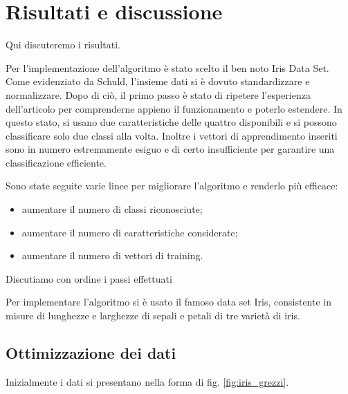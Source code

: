 \chapter{Risultati e discussione}\label{ch:risultati}

Qui discuteremo i risultati. 

Per l'implementazione dell'algoritmo è stato scelto il ben noto 
Iris Data Set. Come evidenziato da Schuld\cite{schuld}, 
l'insieme dati si è dovuto standardizzare e 
normalizzare. Dopo di ciò, il primo passo è stato di 
ripetere l'esperienza dell'articolo per comprenderne 
appieno il funzionamento e poterlo estendere. 
In questo stato, si usano due caratteristiche delle 
quattro disponibili e si possono classificare solo 
due classi alla volta. Inoltre i vettori di apprendimento 
inseriti sono in numero estremamente esiguo e di certo 
insufficiente per garantire una classificazione efficiente. 


Sono state seguite varie linee per migliorare l'algoritmo 
e renderlo più efficace: 
\begin{itemize}
    \item aumentare il numero di classi riconosciute;
    \item aumentare il numero di caratteristiche considerate;
    \item aumentare il numero di vettori di training.
\end{itemize}


Discutiamo con ordine i passi effettuati

Per implementare l'algoritmo si è usato il famoso data set Iris, 
consistente in misure di lunghezze e larghezze di sepali e petali di 
tre varietà di iris. 

\section{Ottimizzazione dei dati}

Inizialmente i dati si presentano nella forma di fig. \ref{fig:iris_grezzi}. 

